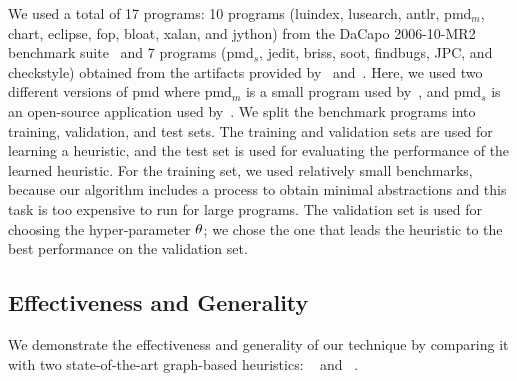We used a total of 17 programs: 10 programs (luindex, lusearch, antlr, pmd$_{m}$, chart, eclipse, fop, bloat, xalan, and jython) from the DaCapo 2006-10-MR2 benchmark suite~\cite{Blackburn2006}
and 7 programs (pmd$_{s}$, jedit, briss, soot, findbugs, JPC, and checkstyle) obtained from the artifacts provided by~\cite{Tan2017} and~\cite{Li2018b}.
Here, we used two different versions of pmd where pmd$_{m}$ is a small program used by~\cite{Tan2017}, and pmd$_{s}$ is an open-source application used by~\cite{Li2018b}.
We split the benchmark programs into training, validation, and test sets.
The training and validation sets are used for learning a heuristic, and the test set is used for evaluating the performance of the learned heuristic.
For the training set, we used relatively small benchmarks, because our algorithm includes a process
to obtain minimal abstractions and this task is too expensive to run for large programs.
The validation set is used for choosing the hyper-parameter ${\theta}$; we chose the one that leads the heuristic to the best performance on the validation set.


\subsection{Effectiveness and Generality}\label{sec:graphick:effectiveness}
We demonstrate the effectiveness and generality of our technique by comparing it with two state-of-the-art graph-based heuristics: \Scaler~\cite{Li2018b} and \Mahjong~\cite{Tan2017}.


